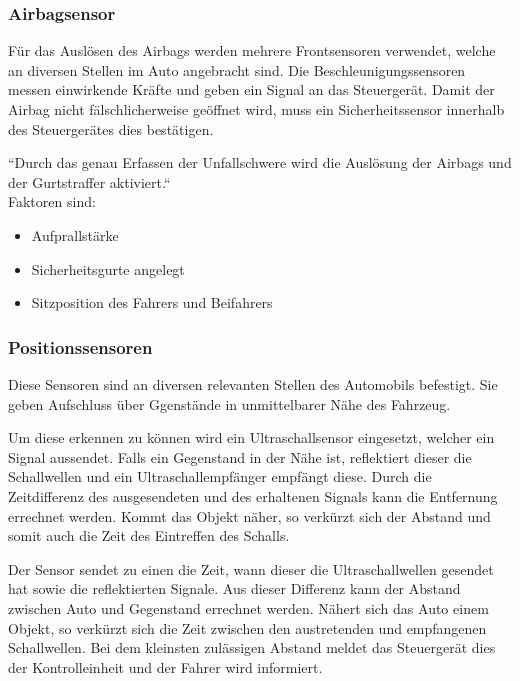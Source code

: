                 \subsubsection{Airbagsensor}

                 Für das Auslösen des Airbags werden mehrere Frontsensoren verwendet, welche an diversen Stellen im Auto angebracht sind. Die Beschleunigungssensoren messen einwirkende Kräfte und geben ein Signal an das Steuergerät.
                 Damit der Airbag nicht fälschlicherweise geöffnet wird, muss ein Sicherheitssensor innerhalb des Steuergerätes dies bestätigen. 
                 
                 ``Durch das genau Erfassen der Unfallschwere wird die Auslösung der Airbags und der Gurtstraffer aktiviert.`` \cite{TS_airbag}\\
                 Faktoren sind: 
                 
                 \begin{itemize}
                     \item Aufprallstärke
                     \item Sicherheitsgurte angelegt
                     \item Sitzposition des Fahrers und Beifahrers
                 \end{itemize}
             
             
             \subsubsection{Positionssensoren}

                 Diese Sensoren sind an diversen relevanten Stellen des Automobils befestigt. Sie geben Aufschluss über Ggenstände in unmittelbarer Nähe des Fahrzeug.

                 Um diese erkennen zu können wird ein Ultraschallsensor eingesetzt, welcher ein Signal aussendet. Falls ein Gegenstand in der Nähe ist, reflektiert dieser die Schallwellen und ein Ultraschallempfänger empfängt diese. 
                 Durch die Zeitdifferenz des ausgesendeten und des erhaltenen Signals kann die Entfernung errechnet werden. Kommt das Objekt näher, so verkürzt sich der Abstand und somit auch die Zeit des Eintreffen des Schalls.

                 Der Sensor sendet zu einen die Zeit, wann dieser die Ultraschallwellen gesendet hat sowie die reflektierten Signale. Aus dieser Differenz kann  der Abstand zwischen Auto und Gegenstand errechnet werden. 
                 Nähert sich das Auto einem Objekt, so verkürzt sich die Zeit zwischen den austretenden und empfangenen Schallwellen. Bei dem kleinsten zulässigen Abstand meldet das Steuergerät dies der Kontrolleinheit und der Fahrer wird informiert.

